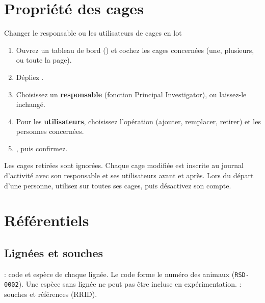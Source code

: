 \documentclass[11pt,a4paper]{article}
\begin{document}
\section{Propriété des cages}\label{sec:propriete}
\begin{procedure}{Changer le responsable ou les utilisateurs de cages en lot}
\begin{enumerate}
  \item Ouvrez un tableau de bord () et
    cochez les cages concernées (une, plusieurs, ou toute la page).
  \item Dépliez .
  \item Choisissez un \textbf{responsable} (fonction Principal
    Investigator), ou laissez-le inchangé.
  \item Pour les \textbf{utilisateurs}, choisissez l'opération (ajouter,
    remplacer, retirer) et les personnes concernées.
  \item {}, puis confirmez.
\end{enumerate}
\end{procedure}
Les cages retirées sont ignorées. Chaque cage modifiée est inscrite au
journal d'activité avec son responsable et ses utilisateurs avant et après.
Lors du départ d'une personne, utilisez  sur toutes ses cages, puis désactivez son compte.

\section{Référentiels}

\subsection{Lignées et souches}
 : code et espèce de chaque
lignée. Le code forme le numéro des animaux (\texttt{RSD-0002}). Une espèce
sans lignée ne peut pas être incluse en expérimentation.
 : souches et références (RRID).
\end{document}
